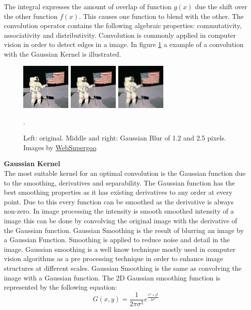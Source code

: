 \documentclass[a4paper]{article}
\begin{document}
\begin{appendices}
The integral expresses the amount of overlap of function $g(x)$
due the shift over the other function $f(x)$. This causes one function to blend with the other. The convolution operator contains the following algebraic properties: commutativity, associativity and distributivity. Convolution is commonly applied in computer vision in order to detect edges in a image. In figure \ref{gaussianblur} a example of a convolution with the Gaussian Kernel is illustrated.
\begin{figure}[!ht]
\centering
\includegraphics[width=0.22\textwidth]{images/gaussianblur_before.jpg}
\includegraphics[width=0.22\textwidth]{images/gaussianblur_after1.jpg}
\includegraphics[width=0.22\textwidth]{images/gaussianblur_after2.jpg}
\caption[Gaussian Blur]{Left: original. Middle and right: Gaussian Blur of 1.2 and 2.5 pixels. Images by \href{http://www.websupergoo.com/helpie/}{WebSupergoo}}.
\label{gaussianblur}
\end{figure}

\noindent\textbf{Gaussian Kernel}\\
The most suitable kernel for an optimal convolution is the Gaussian function due to the smoothing, derivatives and separability. The Gaussian function has the best smoothing properties as it has existing derivatives to any order at every point. Due to this every function can be smoothed as the derivative is always non-zero. In image processing the intensity is smooth smoothed intensity of a image this can be done by convolving the original image with the derivative of the Gaussian function. Gaussian Smoothing is the result of blurring an image by a Gaussian Function. Smoothing is applied to reduce noise and detail in the image. Gaussian smoothing is a well know technique mostly used in computer vision algorithms as a pre processing technique in order to enhance image structures at different scales. Gaussian Smoothing is the same as convolving the image with a Gaussian function. The 2D Gaussian smoothing function is represented by the following equation:
\begin{equation*}
G(x,y) = \frac{1}{2\pi\sigma^2}e^{\frac{x^2 + y^2}{2\sigma^2}}
\end{equation*}

\end{appendices}
\end{document}
